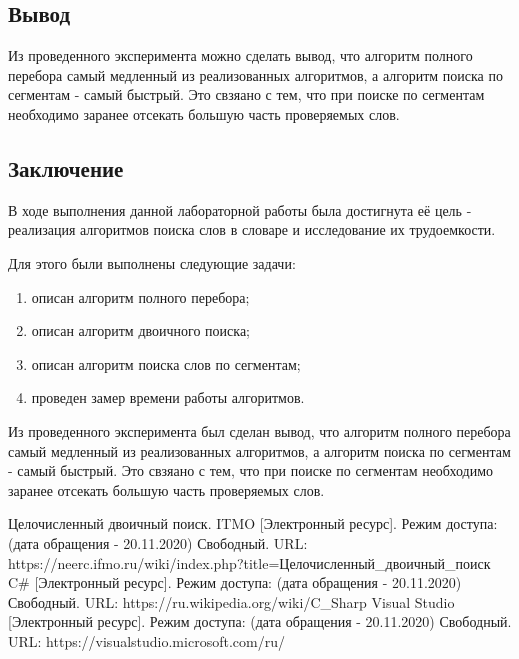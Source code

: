 \documentclass{article}
\begin{document}
	\subsection{Вывод}
	Из проведенного эксперимента можно сделать вывод, что алгоритм полного перебора самый медленный из реализованных алгоритмов, а алгоритм поиска по сегментам - самый быстрый. Это свзяано с тем, что при поиске по сегментам необходимо заранее отсекать большую часть проверяемых слов.

	\newpage
	\begin{center}
		\section*{Заключение}
	\end{center}
	\indent \indent В ходе выполнения данной лабораторной работы была достигнута её цель -  реализация 
    алгоритмов поиска слов в словаре и исследование их трудоемкости. 

Для этого были выполнены следующие задачи:

    \begin{enumerate}
        \item описан алгоритм полного перебора;
        \item описан алгоритм двоичного поиска;
        \item описан алгоритм поиска слов по сегментам;
        \item проведен замер времени работы алгоритмов.
    \end{enumerate}

	Из проведенного эксперимента был сделан вывод, что алгоритм полного перебора самый медленный из реализованных алгоритмов, а алгоритм поиска по сегментам - самый быстрый. Это свзяано с тем, что при поиске по сегментам необходимо заранее отсекать большую часть проверяемых слов.

	\newpage
	
	\begin{center}
	\begin{thebibliography}{3}
	Целочисленный двоичный поиск. ITMO [Электронный ресурс]. Режим доступа: (дата обращения - 20.11.2020) Свободный. URL: https://neerc.ifmo.ru/wiki/index.php?title=Целочисленный\_двоичный\_поиск
	C\# [Электронный ресурс]. Режим доступа: (дата обращения - 20.11.2020) Свободный. URL: https://ru.wikipedia.org/wiki/C\_Sharp
	Visual Studio [Электронный ресурс]. Режим доступа: (дата обращения - 20.11.2020) Свободный. URL: https://visualstudio.microsoft.com/ru/

	\end{thebibliography}
	\end{center}
\end{document}
